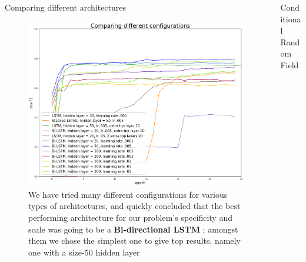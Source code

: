 \documentclass[final]{beamer}
\newlength{\onecolwid}
\newlength{\twocolwid}
\begin{document}
\begin{frame}[t]
\begin{columns}[t]
\begin{column}{\twocolwid}
\begin{columns}[t,totalwidth=\twocolwid]
\begin{column}{\onecolwid}
\begin{block}{Comparing different architectures}

\begin{figure}
\begin{center}
\includegraphics[width=600px]{figs/config_compar.png}
\caption{We have tried many different configurations for various types of architectures, and quickly concluded that the best performing architecture for our problem's specificity and scale was going to be a \textbf{Bi-directional LSTM} ; amongst them we chose the simplest one to give top results, namely one with a size-50 hidden layer}
\label{config_compar}
\end{center}
\end{figure}

\end{block}


\end{column} %

\begin{column}{\onecolwid}\vspace{-.6in} %


\begin{block}{Conditional Random Field}


\end{block}
\end{column}
\end{columns}
\end{column}
\end{columns}
\end{frame}
\end{document}
